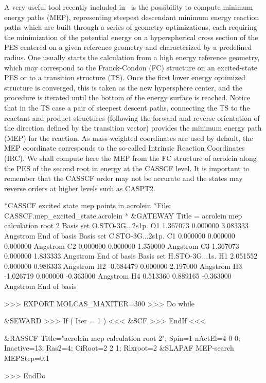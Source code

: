 A very useful tool recently included in \molcas\ is the possibility to
compute minimum energy paths (MEP), representing steepest descendant minimum
energy reaction paths which are built through a series of geometry optimizations, 
each requiring the minimization of the potential energy on a hyperspherical
cross section of the PES centered on a given reference geometry and characterized 
by a predefined radius. One usually starts the calculation from a high energy reference
geometry, which may correspond to the Franck-Condon (FC) structure on an excited-state PES 
or to a transition structure (TS). Once the first lower energy optimized structure is
converged, this is taken as the new hypersphere center, and the procedure is iterated 
until the bottom of the energy surface is reached. Notice that in the TS case a pair of
steepest descent paths, connecting the TS to the reactant and product structures 
(following the forward and reverse orientation of the direction defined by the transition 
vector) provides the minimum energy path (MEP) for the reaction. As mass-weighted 
coordinates are used by default, the MEP coordinate corresponds to the so-called Intrinsic 
Reaction Coordinates (IRC). We shall compute here the MEP from the FC structure of acrolein
along the PES of the second root in energy at the CASSCF level. It is important to remember 
that the CASSCF order may not be accurate and the states may reverse orders at higher
levels such as CASPT2.

\begin{inputlisting}
*CASSCF excited state mep points in acrolein
*File: CASSCF.mep_excited_state.acrolein
*
 &GATEWAY
Title = acrolein mep calculation root 2
Basis set
O.STO-3G...2s1p.
 O1    1.367073     0.000000     3.083333 Angstrom
End of basis
Basis set
C.STO-3G...2s1p.
 C1    0.000000     0.000000     0.000000 Angstrom
 C2    0.000000     0.000000     1.350000 Angstrom
 C3    1.367073     0.000000     1.833333 Angstrom
End of basis
Basis set
H.STO-3G...1s.
 H1    2.051552     0.000000     0.986333 Angstrom
 H2   -0.684479     0.000000     2.197000 Angstrom
 H3   -1.026719     0.000000    -0.363000 Angstrom
 H4    0.513360     0.889165    -0.363000 Angstrom
End of basis

>>> EXPORT MOLCAS_MAXITER=300
>>> Do while

 &SEWARD
>>> If ( Iter = 1 ) <<<
 &SCF 
>>> EndIf <<<

 &RASSCF 
   Title="acrolein mep calculation root 2"; Spin=1
   nActEl=4 0 0; Inactive=13; Ras2=4; CiRoot=2 2 1; Rlxroot=2
 &SLAPAF 
   MEP-search
   MEPStep=0.1

>>> EndDo
\end{inputlisting}

